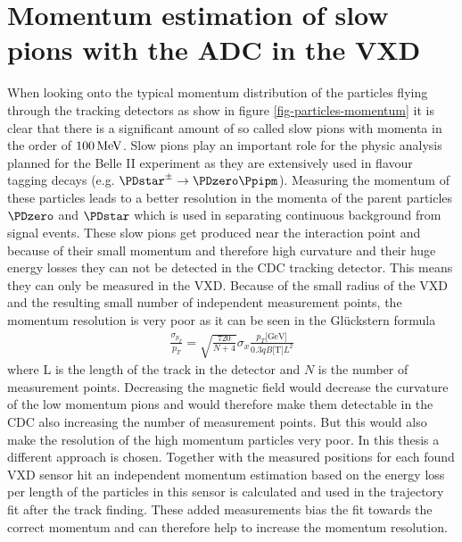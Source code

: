 \newcommand{\dedx}{$\mathrm d E / \mathrm d x$ }
\chapter{Momentum estimation of slow pions with the ADC in the VXD}

When looking onto the typical momentum distribution of the particles flying through the tracking detectors as show in figure \ref{fig-particles-momentum} it is clear that there is a significant amount of so called slow pions with momenta in the order of $\unit[100]{MeV}$. Slow pions play an important role for the physic analysis planned for the Belle II experiment as they are extensively used in flavour tagging decays (e.g. $\PDstar^\pm \to \PDzero \Ppipm$). Measuring the momentum of these particles leads to a better resolution in the momenta of the parent particles $\PDzero$ and $\PDstar$ which is used in separating continuous background from signal events. These slow pions get produced near the interaction point and because of their small momentum and therefore high curvature and their huge energy losses they can not be detected in the CDC tracking detector. This means they can only be measured in the VXD. Because of the small radius of the VXD and the resulting small number of independent measurement points, the momentum resolution is very poor as it can be seen in the Glückstern formula
\begin{align*}
 \frac{\sigma_{p_T}}{p_T} = \sqrt{\frac{720}{N + 4}} \sigma_x \frac{p_T \text{[GeV]}}{0.3 q B \text{[T]} L^2}
\end{align*}
where L is the length of the track in the detector and $N$ is the number of measurement points. Decreasing the magnetic field would decrease the curvature of the low momentum pions and would therefore make them detectable in the CDC also increasing the number of measurement points. But this would also make the resolution of the high momentum particles very poor. In this thesis a different approach is chosen. Together with the measured positions for each found VXD sensor hit an independent momentum estimation based on the energy loss per length of the particles in this sensor is calculated and used in the trajectory fit after the track finding. These added measurements bias the fit towards the correct momentum and can therefore help to increase the momentum resolution.

